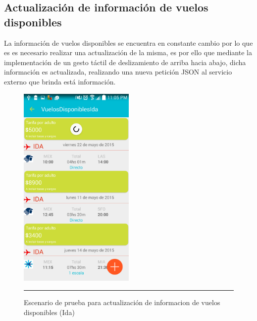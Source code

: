 \subsection{Actualización de información de vuelos disponibles}
La información de vuelos disponibles se encuentra en constante cambio por lo que es es necesario realizar una actualización de la misma, 
es por ello que mediante la implementación de un gesto táctil de deslizamiento de arriba hacia abajo, dicha información es actualizada, 
realizando una nueva petición JSON al servicio externo que brinda está información.
\begin{figure}[h]
	\centering
		\includegraphics[width=0.5\textwidth]{Figuras/actualizaIdas.png}
		\rule{30em}{0.5pt}
	\caption[Escenario de prueba para actualización de información de vuelos disponibles (Ida)]{Escenario de prueba para actualización de informacion de vuelos disponibles (Ida)}
	\label{fig:vistaPruebaActi}
\end{figure}
\clearpage

